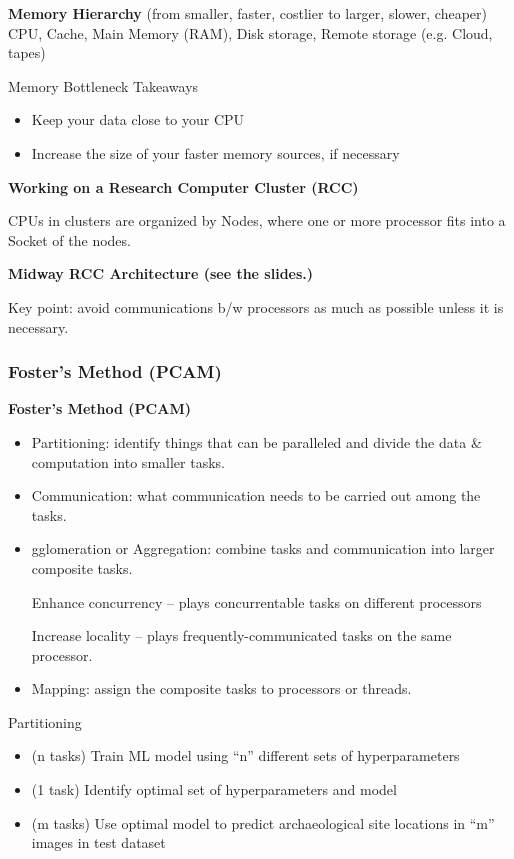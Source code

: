 \documentclass{article}
\begin{document}
\textbf{Memory Hierarchy} (from smaller, faster, costlier to larger, slower, cheaper)
CPU, Cache, Main Memory (RAM), Disk storage, Remote storage (e.g. Cloud, tapes)

Memory Bottleneck Takeaways
\begin{itemize}
    \item Keep your data close to your CPU
    \item Increase the size of your faster memory sources, if necessary
\end{itemize}

\textbf{Working on a Research Computer Cluster (RCC)}

CPUs in clusters are organized by Nodes, where one or more processor fits into a Socket of the nodes. 

\textbf{Midway RCC Architecture (see the slides.)}

Key point: avoid communications b/w processors as much as possible unless it is necessary. 

\subsubsection{Foster's Method (PCAM)}

\textbf{Foster's Method (PCAM)}
\begin{itemize}
    \item Partitioning: identify things that can be paralleled and divide the data \& computation into smaller tasks.
    \item Communication: what communication needs to be carried out among the tasks.
    \item gglomeration or Aggregation: combine tasks and communication into larger composite tasks. 
    
    Enhance concurrency – plays concurrentable tasks on different processors
    
    Increase locality – plays frequently-communicated tasks on the same processor.
    \item Mapping: assign the composite tasks to processors or threads.
\end{itemize}

Partitioning
\begin{itemize}
    \item (n tasks) Train ML model using “n” different sets of hyperparameters
    \item (1 task) Identify optimal set of hyperparameters and model
    \item (m tasks) Use optimal model to predict archaeological site locations in “m” images in test dataset
\end{itemize}
\end{document}
